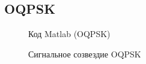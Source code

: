 \documentclass[12pt,a4paper]{scrartcl}
\begin{document}
\subsection{OQPSK}
\label{sec:OQPSK}
\begin{figure}[h!]
\caption{Код Matlab (OQPSK)}
\end{figure}

\begin{figure}[h!]
\caption{Сигнальное созвездие OQPSK}
\end{figure}

\clearpage
\newpage
\end{document}
